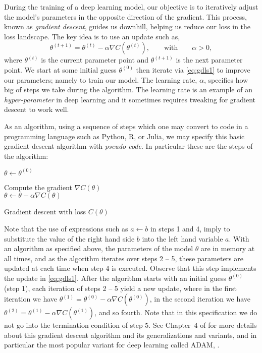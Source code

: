 During the training of a deep learning model, our objective is to iteratively adjust the model's parameters in the opposite direction of the gradient. This process, known as {\em gradient descent}, guides us downhill, helping us reduce our loss in the loss landscape. The key idea is to use an update such as,
%
\begin{equation}
\label{eq:gdls1}
\theta^{(t+1)} = \theta^{(t)} - \alpha \nabla C(\theta^{(t)}),
\qquad
\text{with}
\qquad
\alpha > 0,
\end{equation}
%
where $\theta^{(t)}$ is the current parameter point and $\theta^{(t+1)}$ is the next parameter point. We start at some initial guess  $\theta^{(0)}$ then iterate via \eqref{eq:gdls1} to improve our parameters; namely to train our model. The learning rate, $\alpha$,  specifies how big of steps we take during the algorithm. The learning rate is an example of an {\em hyper-parameter} in deep learning and it sometimes requires tweaking for gradient descent to work well.

As an algorithm, using a sequence of steps which one may convert to code in a programming language such as Python, R, or Julia, we may specify this basic gradient descent algorithm with {\em pseudo code}. In particular these are the  steps of the algorithm:

\vspace{0.5cm}
\begin{algorithm}[H]
\renewcommand{\thealgocf}{} %
\DontPrintSemicolon
  $\theta \leftarrow \theta^{(0)}$
  
   { 
  Compute the gradient $ \nabla C(\theta)$\\
   $\theta \leftarrow \theta - \alpha \nabla C(\theta)$
  }
\caption{Gradient descent with loss $C(\theta)$}\label{alg:basic-gradient-descent}
\end{algorithm}
\vspace{0.5cm}

%
Note that the use of expressions such as $a \leftarrow b$ in steps 1 and 4, imply to substitute the value of the right hand side $b$ into the left hand variable $a$. With an algorithm as specified above, the parameters of the model $\theta$ are in memory at all times, and as the algorithm iterates over steps 2 -- 5, these parameters are updated at each time when step 4 is executed. Observe that this step implements the update in \eqref{eq:gdls1}. After the algorithm starts with an initial guess $\theta^{(0)}$ (step 1), each iteration of steps 2 -- 5 yield a new update, where in the first iteration we have $\theta^{(1)} = \theta^{(0)} - \alpha \nabla C(\theta^{(0)})$, in the second iteration we have $\theta^{(2)} = \theta^{(1)} - \alpha \nabla C(\theta^{(1)})$, and so fourth. Note that in this specification we do not go into the termination condition of step 5. See Chapter~4 of  \cite{LiquetMokaNazarathy2024DeepLearning} for more details about this gradient descent algorithm and its generalizations and variants, and in particular the most popular variant for deep learning called ADAM, \cite{kingma2014adam}. 

